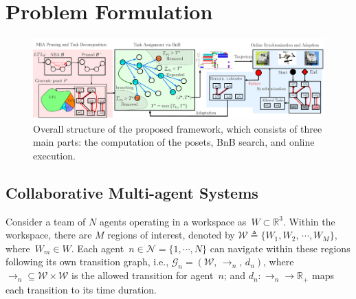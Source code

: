\section{Problem Formulation}\label{sec:problem}

\begin{figure}[t!]
	\centering
	\includegraphics[width=0.9\linewidth]{figures/logic_fig1.pdf}
	\caption{Overall structure of the proposed framework,
          which consists of three main parts:
        the computation of the posets, BnB search, and online execution.}
	\label{fig:logic_graph}
\end{figure}

\subsection{Collaborative Multi-agent Systems}\label{subsec:multi-agent}

Consider a team of $N$ agents operating in a workspace as~${W}\subset \mathbb{R}^3$.
Within the workspace, there are $M$ regions of interest,
denoted by ${\mathcal{W}}\triangleq \{{W}_1,{W}_2,\,\cdots,{W}_M\}$, 
where~${W}_m\in {W}$.
Each agent~$n\in\mathcal{N}=\{1,\cdots,N\}$ can navigate within these regions
following its own transition graph, i.e., $\mathcal{G}_n=({\mathcal{W}},\,\rightarrow_n,\,d_n)$,
where $\rightarrow_n\subseteq {\mathcal{W}}\times {\mathcal{W}}$
is the allowed transition for agent~$n$;
and $d_n:\rightarrow_n \rightarrow \mathbb{R}_{+}$ maps each transition to its time duration.

